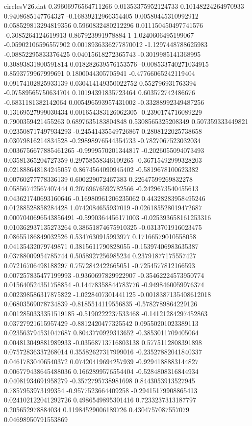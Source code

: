 \begin{filecontents}{circlesV26.dat}
0.39606976564711266	0.01353375952124733	0.10148224264970933
0.9408685147764327	-0.16839212966354405	0.00580445310992912
0.058529813294819356	0.5960832480212296	0.011150450497741576
-0.3085264124619913	0.867923991978884	1
1.0240606495199067	-0.05902106596557902	0.0018936336277870012
-1.1297448788625983	-0.08852295833376425	0.04015618272365743
-0.3019985141368995	0.30893831800591814	0.018282639576153576
-0.008533740271034915	0.8593779967999691	0.1800044305705941
-0.47766065242119404	0.09174102825933139	0.030414149350022752
0.552796931763394	-0.07589565750634704	0.10194391835723464
0.603572742486676	-0.6831181382142064	0.005496593957431002
-0.33288992349487256	0.13169527999030434	0.001654383126062305
-0.2390174716089229	0.7900359421455263	0.6897635183804848
0.5308565325208349	0.507359333449821	0.023508717497934293
-0.24541435549726867	0.2808122025738658	0.03079816214834528
-0.29898976544354733	-0.7827067523032034	0.0036756677885461265
-0.9999570201344817	-0.2026055094073493	0.03581365204727359
0.29758558346109265	-0.36715492999328203	0.021888648184245057
0.8674564090945402	-0.5819678100623382	0.00760277778336139
0.600229072467383	0.22647599269832278	0.05856742567407444
0.20769676592782566	-0.2429673540455613	0.043621740693160646
-0.16980961206235062	0.44328283958495246	0.01288528858284428
1.0742084655937019	-0.026185528019472687	0.0007040696543856491
-0.5990364456171003	-0.025393658161253316	0.010362937135273264
0.38651874675910325	-0.0313701916023475	0.08655186849032526
0.5347630915993977	0.17166579010558058	0.04135432079749871
0.3815611790828055	-0.15397406983635387	0.03788009954785744
0.5058927256985234	0.23791877175557427	0.07216706498188297
0.7572842422665051	-0.7254577812166593	0.007257835477199993
-0.9360697829922907	-0.35462224573950774	0.015640524351758854
-0.14478358844783776	-0.9498460059976374	0.002398586317875822
-1.0228407301441125	-0.0018387135408612018	0.06803569078734839
-0.8185514119556835	-0.5782789864229126	0.0012850333351519185
-0.5190222237533468	-0.14121284297452863	0.03727921615957429
-0.8812420477325542	0.09550201023389113	0.023563794531047687
0.8043770929313652	-0.3853011709405064	0.004813049881989933
-0.03568713716803138	0.5775112808391898	0.07572836337268014
0.35582627317999016	-0.23527882041840337	0.04617830406540372
0.07420419694257939	-0.9294188883144827	0.006779438645488036
0.1662899576554404	-0.5284808316844934	0.04081934691958279
-0.3572795738981698	0.8443053913527945	0.7857953973199354
-0.9577523664409258	-0.29415179908865413	0.024102122041292726
0.4986549895301416	0.7233237313187797	0.205652978884034
0.11984529006189726	0.4304757087557079	0.04698950791553869

\end{filecontents}
